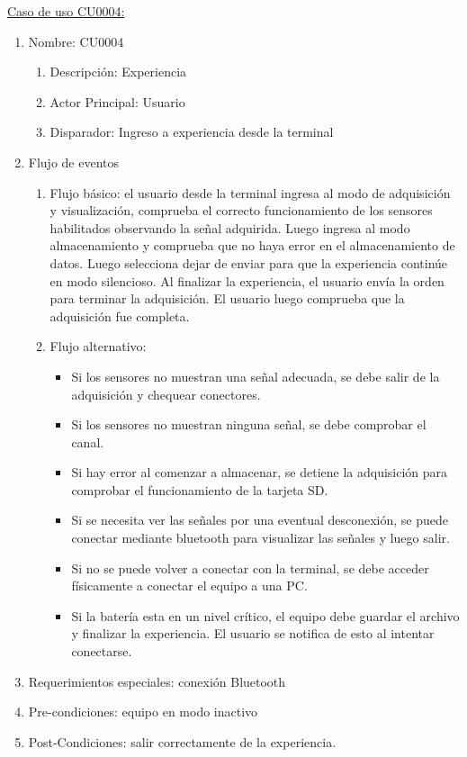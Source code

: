 	\underline{Caso de uso CU0004:}

	\begin{enumerate} 
		\item Nombre: CU0004
		\begin{enumerate} [label*=\arabic*.]
			\item Descripción: Experiencia
			\item Actor Principal: Usuario
			\item Disparador: Ingreso a experiencia desde la terminal
		\end{enumerate}
		\item Flujo de eventos
		\begin{enumerate} [label*=\arabic*.]
			\item Flujo básico: el usuario desde la terminal ingresa al modo de adquisición y visualización, comprueba el correcto funcionamiento de los sensores habilitados observando la señal adquirida. Luego ingresa al modo almacenamiento y comprueba que no haya error en el almacenamiento de datos. Luego selecciona dejar de enviar para que la experiencia continúe en modo silencioso. Al finalizar la experiencia, el usuario envía la orden para terminar la adquisición. El usuario luego comprueba que la adquisición fue completa.
			\item Flujo alternativo:
			\begin{itemize}
				\item Si los sensores no muestran una señal adecuada, se debe salir de la adquisición y chequear conectores.
				\item Si los sensores no muestran ninguna señal, se debe comprobar el canal.
				\item Si hay error al comenzar a almacenar, se detiene la adquisición para comprobar el funcionamiento de la tarjeta SD.
				\item Si se necesita ver las señales por una eventual desconexión, se puede conectar mediante bluetooth para visualizar las señales y luego salir. 
				\item Si no se puede volver a conectar con la terminal, se debe acceder físicamente a conectar el equipo a una PC.
				\item Si la batería esta en un nivel crítico, el equipo debe guardar el archivo y finalizar la experiencia. El usuario se notifica de esto al intentar conectarse.					
			\end{itemize}				
		\end{enumerate}

		\item Requerimientos especiales: conexión Bluetooth
		\item Pre-condiciones: equipo en modo inactivo
		\item Post-Condiciones: salir correctamente de la experiencia.
	\end{enumerate}

